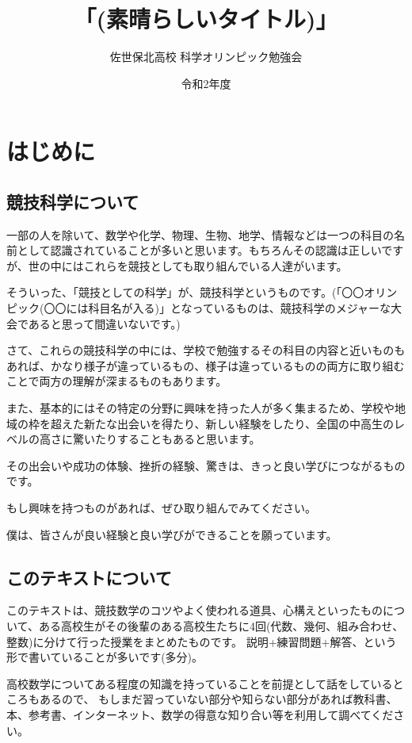 \documentclass[uplatex,dvipdfmx]{jsbook}
\begin{document}
\title{\HUGE 「(素晴らしいタイトル)」}
\author{\LARGE 佐世保北高校 科学オリンピック勉強会}
\date{令和2年度}
\maketitle

\chapter{はじめに}
\section{競技科学について}
一部の人を除いて、数学や化学、物理、生物、地学、情報などは一つの科目の名前として認識されていることが多いと思います。もちろんその認識は正しいですが、世の中にはこれらを競技としても取り組んでいる人達がいます。

そういった、「競技としての科学」が、競技科学というものです。(「〇〇オリンピック(〇〇には科目名が入る)」となっているものは、競技科学のメジャーな大会であると思って間違いないです。)

さて、これらの競技科学の中には、学校で勉強するその科目の内容と近いものもあれば、かなり様子が違っているもの、様子は違っているものの両方に取り組むことで両方の理解が深まるものもあります。

また、基本的にはその特定の分野に興味を持った人が多く集まるため、学校や地域の枠を超えた新たな出会いを得たり、新しい経験をしたり、全国の中高生のレベルの高さに驚いたりすることもあると思います。

その出会いや成功の体験、挫折の経験、驚きは、きっと良い学びにつながるものです。

もし興味を持つものがあれば、ぜひ取り組んでみてください。

僕は、皆さんが良い経験と良い学びができることを願っています。

\section{このテキストについて}
このテキストは、競技数学のコツやよく使われる道具、心構えといったものについて、ある高校生がその後輩のある高校生たちに4回(代数、幾何、組み合わせ、整数)に分けて行った授業をまとめたものです。
説明+練習問題+解答、という形で書いていることが多いです(多分)。

高校数学についてある程度の知識を持っていることを前提として話をしているところもあるので、
もしまだ習っていない部分や知らない部分があれば教科書、本、参考書、インターネット、数学の得意な知り合い等を利用して調べてください。
\end{document}
